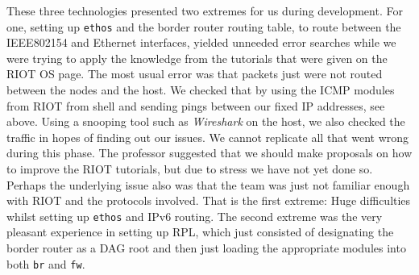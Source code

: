 \documentclass[acmtog, language=english, nonacm]{acmart}
\begin{document}
    These three technologies presented two extremes for us during development. For one, setting up \texttt{ethos} and the border router routing table, to route between the IEEE802154 and Ethernet interfaces, yielded unneeded error searches while we were trying to apply the knowledge from the tutorials that were given on the RIOT OS page. The most usual error was that packets just were not routed between the nodes and the host. We checked that by using the ICMP modules from RIOT from shell and sending pings between our fixed IP addresses, see above. Using a snooping tool such as \emph{Wireshark} on the host, we also checked the traffic in hopes of finding out our issues. We cannot replicate all that went wrong during this phase. The professor suggested that we should make proposals on how to improve the RIOT tutorials, but due to stress we have not yet done so. Perhaps the underlying issue also was that the team was just not familiar enough with RIOT and the protocols involved. That is the first extreme: Huge difficulties whilst setting up \texttt{ethos} and IPv6 routing. The second extreme was the very pleasant experience in setting up RPL, which just consisted of designating the border router as a DAG root and then just loading the appropriate modules into both \texttt{br} and \texttt{fw}.
\end{document}
